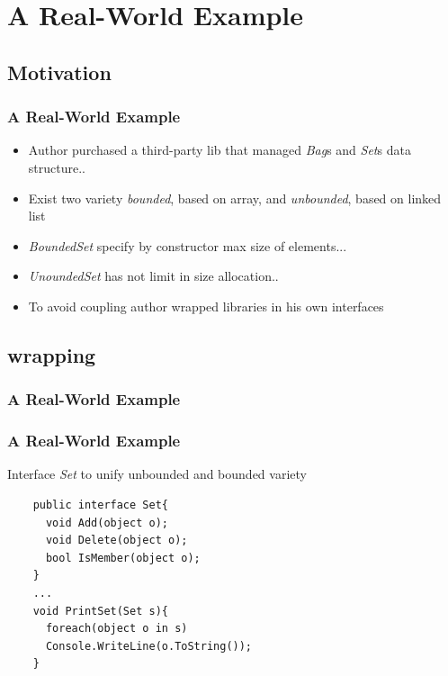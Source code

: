 \documentclass{beamer}
\begin{document}
\section{A Real-World Example}
\subsection{Motivation}
\begin{frame}
  \frametitle{A Real-World Example}
  \begin{itemize}
	\item<+-> Author purchased a third-party lib that managed \textit{Bag}s and \textit{Set}s data structure..
	\item<+-> Exist two variety \textit{bounded}, based on array, and \textit{unbounded}, based on linked list
	\item<+-> \textit{BoundedSet} specify by constructor max size of elements...
	\item<+-> \textit{UnoundedSet} has not limit in size allocation..
	\item<+-> To avoid coupling author wrapped libraries in his own interfaces
   \end{itemize}
\end{frame}

\subsection{wrapping}
\begin{frame}
  \frametitle{A Real-World Example}
\end{frame}

\begin{frame}[containsverbatim]
	\frametitle{A Real-World Example}
	Interface \textit{Set} to unify unbounded and bounded variety\\
	\begin{lstlisting}
	public interface Set{
      void Add(object o);
      void Delete(object o);
      bool IsMember(object o);
	}
    ...
    void PrintSet(Set s){
	  foreach(object o in s)
  	  Console.WriteLine(o.ToString());
	}	
	\end{lstlisting}
\end{frame}
\end{document}
